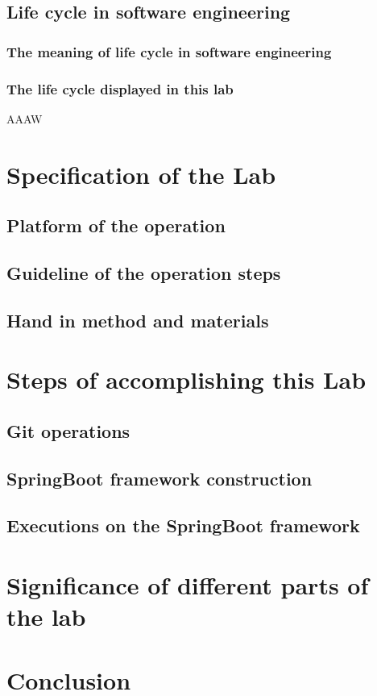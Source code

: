 \documentclass[a4paper]{report}
\begin{document}
\section{Life cycle in software engineering}
\subsection{The meaning of life cycle in software engineering}
\subsection{The life cycle displayed in this lab}
AAAW
\chapter{Specification of the Lab}
\section{Platform of the operation}
\section{Guideline of the operation steps}
\section{Hand in method and materials}
\chapter{Steps of accomplishing this Lab}
\section{Git operations}
\section{SpringBoot framework construction}
\section{Executions on the SpringBoot framework}
\chapter{Significance of different parts of the lab}
\chapter{Conclusion}
\end{document}
